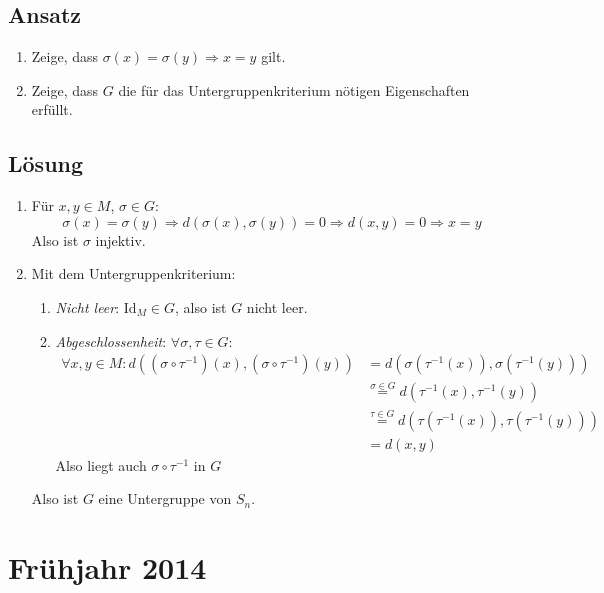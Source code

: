 \subsection{Ansatz}
\begin{enumerate}
	\item Zeige, dass \( \sigma(x) = \sigma(y) \Rightarrow x=y \) gilt. 
	\item Zeige, dass \( G \) die für das Untergruppenkriterium nötigen Eigenschaften erfüllt.
\end{enumerate}

\subsection{Lösung}
\begin{enumerate}
	\item Für \( x,y \in M \), \( \sigma \in G \): 
	\begin{equation*}
	 	\sigma(x) = \sigma(y) \Rightarrow d(\sigma(x), \sigma(y)) = 0 \Rightarrow d(x,y) = 0 \Rightarrow x = y
	 \end{equation*}
	 Also ist \( \sigma \) injektiv.

	\item Mit dem Untergruppenkriterium:
	\begin{enumerate}
		\item \emph{Nicht leer}: \( \text{Id}_M \in G \), also ist \( G \) nicht leer.
		\item \emph{Abgeschlossenheit}: \( \forall \sigma, \tau \in G \):
		\begin{align*}
			\forall x,y \in M: d((\sigma \circ \tau^{-1})(x), (\sigma \circ \tau^{-1})(y)) &= d(\sigma(\tau^{-1}(x)), \sigma(\tau^{-1}(y))) \\
			 &\stackrel{\sigma \in G}{=} d(\tau^{-1}(x), \tau^{-1}(y)) \\
			 &\stackrel{\tau \in G}{=} d(\tau(\tau^{-1}(x)), \tau(\tau^{-1}(y))) \\
			 &= d(x,y)
		\end{align*}
		Also liegt auch \( \sigma \circ \tau^{-1} \) in \( G \)
	\end{enumerate}
	Also ist \( G \) eine Untergruppe von \( S_n \).
\end{enumerate}

\newpage

\section{Frühjahr 2014}

